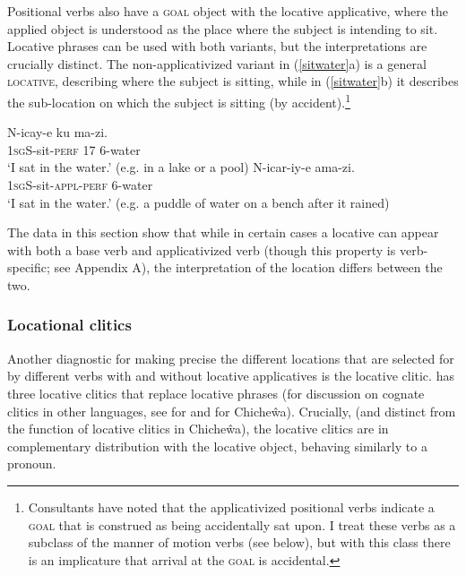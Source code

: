 \documentclass[output=paper]{langsci/langscibook}
\begin{document}
\fi

 Positional verbs also have a {\scshape goal} object with the locative applicative, where the applied object is understood as the place where the subject is intending to sit.  Locative phrases can be used with both variants, but the interpretations are crucially distinct. The non-applicativized variant in (\ref{sitwater}a) is a general {\scshape locative}, describing where the subject is sitting, while in (\ref{sitwater}b) it describes the sub-location on which the subject is sitting (by accident).\footnote{Consultants have noted that the applicativized positional verbs indicate a {\scshape goal}  that is construed as being accidentally sat upon. I treat these verbs as a subclass of the manner of motion verbs (see below), but with this class there is an implicature that arrival at the {\scshape goal}  is accidental.}
	\begin{exe}
		\ex\label{sitwater}\begin{xlist}
		\ex\gll N-icay-e ku ma-zi.\\
				1{\scshape sgS-}sit-{\scshape perf} 17 6-water\\
				\glt `I sat in the water.' (e.g. in a lake or a pool)
		\ex\gll N-icar-iy-e ama-zi.\\
				1{\scshape sgS-}sit-{\scshape appl-perf} 6-water\\
				\glt `I sat in the water.' (e.g. a puddle of water on a bench after it rained)
	\end{xlist}
	\end{exe}
%
The data in this section show that while in certain cases a locative can appear with both a base verb and applicativized verb (though this property is verb-specific; see Appendix A), the interpretation of the location differs between the two. 

\subsubsection{Locational clitics}%

Another diagnostic for making precise the different locations that are selected for by different verbs with and without locative applicatives is the locative clitic.  has three locative clitics that  replace locative phrases (for discussion on cognate clitics in other languages, see \citet{diercks:2011} for  and \citet{simango:2012} for Chicheŵa). 	Crucially, (and distinct from the function of locative clitics in Chicheŵa), the locative clitics are in complementary distribution with the locative object, behaving similarly to a pronoun. 
% 
\end{document}
